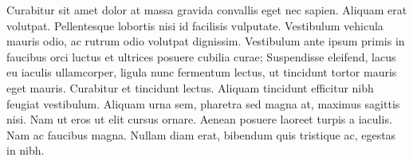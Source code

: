Curabitur sit amet dolor at massa gravida convallis eget nec sapien. Aliquam erat volutpat. Pellentesque lobortis nisi id facilisis vulputate. Vestibulum vehicula mauris odio, ac rutrum odio volutpat dignissim. Vestibulum ante ipsum primis in faucibus orci luctus et ultrices posuere cubilia curae; Suspendisse eleifend, lacus eu iaculis ullamcorper, ligula nunc fermentum lectus, ut tincidunt tortor mauris eget mauris. Curabitur et tincidunt lectus. Aliquam tincidunt efficitur nibh feugiat vestibulum. Aliquam urna sem, pharetra sed magna at, maximus sagittis nisi. Nam ut eros ut elit cursus ornare. Aenean posuere laoreet turpis a iaculis. Nam ac faucibus magna. Nullam diam erat, bibendum quis tristique ac, egestas in nibh.
 

\bye